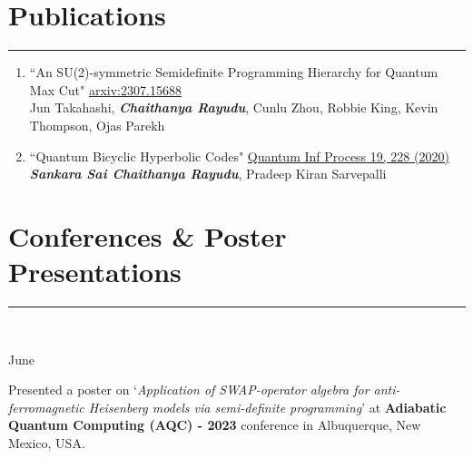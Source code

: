 \documentclass[10pt]{article}
\newcommand\vtick{\textquotesingle}
\begin{document}
\section*{\color{black} Publications}
\noindent\textcolor{black}{\rule{\textwidth}{1pt}} 
\begin{enumerate}[leftmargin=*]
    \item ``An SU(2)-symmetric Semidefinite Programming Hierarchy for Quantum Max Cut" \href{https://arxiv.org/abs/2307.15688}{arxiv:2307.15688}\\
    Jun Takahashi, {\it \bf Chaithanya Rayudu}, Cunlu Zhou, Robbie King, Kevin Thompson, Ojas Parekh 
    \item ``Quantum Bicyclic Hyperbolic Codes" \href{https://doi.org/10.1007/s11128-020-02727-0}{Quantum Inf Process 19, 228 (2020)}\\
    {\it\bf Sankara Sai Chaithanya Rayudu}, Pradeep Kiran Sarvepalli
\end{enumerate}


\vspace{0.3cm}
\section*{\color{black} Conferences \& Poster Presentations}
\noindent\textcolor{black}{\rule{\textwidth}{1pt}} \vspace{-0.2cm}\\
\begin{minipage}[t]{.2\textwidth}
June\vtick23
\end{minipage}
\begin{minipage}[t]{0.8\textwidth}
Presented a poster on `{\it Application of SWAP-operator algebra for anti-ferromagnetic Heisenberg models via semi-definite programming}' at {\bf Adiabatic Quantum Computing (AQC) - 2023} conference in Albuquerque, New Mexico, USA.
\end{minipage}\\
\end{document}
